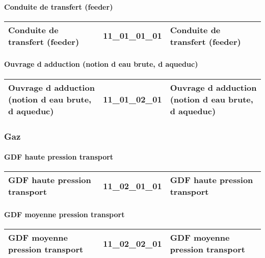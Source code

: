 \documentclass[12pt,titlepage,oneside]{book}
\begin{document}
\paragraph{Conduite de transfert (feeder)}
\noindent
\vspace{\baselineskip}

\renewcommand{\arraystretch}{1.2}
\begin{supertabular}{|p{10cm}|c|p{15cm}|}
 Conduite de transfert (feeder) & 11\_01\_01\_01 & Conduite de transfert (feeder)\\
\hline
\end{supertabular}


\paragraph{Ouvrage d adduction (notion d eau brute, d aqueduc)}
\noindent
\vspace{\baselineskip}

\renewcommand{\arraystretch}{1.2}
\begin{supertabular}{|p{10cm}|c|p{15cm}|}
 Ouvrage d adduction (notion d eau brute, d aqueduc) & 11\_01\_02\_01 & Ouvrage d adduction (notion d eau brute, d aqueduc)\\
\hline
\end{supertabular}

\subsubsection{\large Gaz}
\paragraph{GDF haute pression transport}
\noindent
\vspace{\baselineskip}

\renewcommand{\arraystretch}{1.2}
\begin{supertabular}{|p{10cm}|c|p{15cm}|}
 GDF haute pression transport & 11\_02\_01\_01 & GDF haute pression transport\\
\hline
\end{supertabular}


\paragraph{GDF moyenne pression transport}
\noindent
\vspace{\baselineskip}

\renewcommand{\arraystretch}{1.2}
\begin{supertabular}{|p{10cm}|c|p{15cm}|}
 GDF moyenne pression transport & 11\_02\_02\_01 & GDF moyenne pression transport\\
\hline
\end{supertabular}
\end{document}
